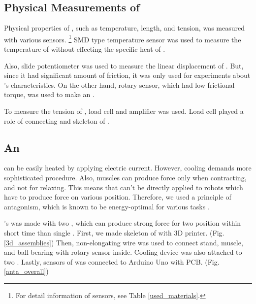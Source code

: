 \subsection{Physical Measurements of \SCP}
Physical properties of \scp, such as temperature, length, and tension, was measured with various sensors.
\footnote{For detail information of sensors, see Table \ref{used_materials}.}
SMD type temperature sensor was used to measure the temperature of \scp without effecting the specific heat of \scpnospace.

Also, slide potentiometer was used to measure the linear displacement of \scpnospace. But, since it had significant amount of friction, it was only used for experiments about \scpnospace's characteristics. On the other hand, rotary sensor, which had low frictional torque, was used to make an \antanospace. 

To measure the tension of \scpnospace, load cell and amplifier was used.
Load cell played a role of connecting \scp and skeleton of \antanospace.

\subsection{An \ANTA}
\scp can be easily heated by applying electric current. However, cooling demands more sophisticated procedure. Also, muscles can produce force only when contracting, and not for relaxing. This means that \scp can't be directly applied to robots which have to produce force on various position.
Therefore, we used a principle of antagonism, which is known to be energy-optimal for various tasks \cite{antagonism}.

\Antanospace's was made with two \scpnospace, which can produce strong force for two position within short time than single \scpnospace.
First, we made skeleton of \anta with 3D printer. (Fig.\ref{3d_assemblies}) Then, non-elongating wire was used to connect stand, muscle, and ball bearing with rotary sensor inside. Cooling device was also attached to two \scpnospace. Lastly, sensors of \anta was connected to Arduino Uno with PCB. (Fig.\ref{anta_overall})

